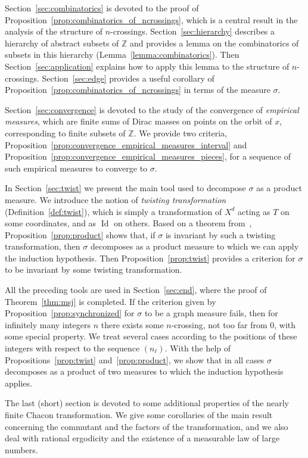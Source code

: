 \documentclass[AHL,Unicode,longabstracts]{cedram}
\DeclareMathOperator{\Id}{Id}
\newcommand{\ZZ}{\mathbb{Z}}
\begin{document}
Section~\ref{sec:combinatorics} is devoted to the proof of Proposition~\ref{prop:combinatorics_of_ncrossings}, which is a central result in the analysis of the structure of $n$-crossings. Section~\ref{sec:hierarchy} describes a hierarchy of abstract subsets of $\ZZ$ and provides a lemma on the combinatorics of subsets in this hierarchy (Lemma~\ref{lemma:combinatorics}). Then Section~\ref{sec:application} explains how to apply this lemma to the structure of $n$-crossings. Section~\ref{sec:edge} provides a useful corollary of Proposition~\ref{prop:combinatorics_of_ncrossings} in terms of the measure $\sigma$.

Section~\ref{sec:convergence} is devoted to the study of the convergence of \emph{empirical measures}, which are finite sums of Dirac masses on points on the orbit of $x$, corresponding to finite subsets of $\ZZ$. We provide two criteria, Proposition~\ref{prop:convergence_empirical_measures_interval} and Proposition~\ref{prop:convergence_empirical_measures_pieces}, for a sequence of such empirical measures to converge to $\sigma$.

In Section~\ref{sec:twist} we present the main tool used to decompose $\sigma$ as a product measure. We introduce the notion of \emph{twisting transformation} (Definition~\ref{def:twist}), which is simply a transformation of $X^d$ acting as $T$ on some coordinates, and as $\Id$ on others. Based on a theorem from~\cite{ChaconInfinite}, Proposition~\ref{prop:product} shows that, if $\sigma$ is invariant by such a twisting transformation, then $\sigma$ decomposes as a product measure to which we can apply the induction hypothesis. Then Proposition~\ref{prop:twist} provides a criterion for $\sigma$ to be invariant by some twisting transformation.

All the preceding tools are used in Section~\ref{sec:end}, where the proof of Theorem~\ref{thm:msj} is completed. If the criterion given by Proposition~\ref{prop:synchronized} for $\sigma$ to be a graph measure fails, then for infinitely many integers $n$ there exists some $n$-crossing, not too far from 0, with some special property. We treat several cases according to the positions of these integers with respect to the sequence $(n_\ell)$. With the help of Propositions~\ref{prop:twist} and~\ref{prop:product}, we show that in all cases $\sigma$ decomposes as a product of two measures to which the induction hypothesis applies.

The last (short) section is devoted to some additional properties of the nearly finite Chacon transformation. We give some corollaries of the main result concerning the commutant and the factors of the transformation, and we also deal with rational ergodicity and the existence of a measurable law of large numbers.
\end{document}
